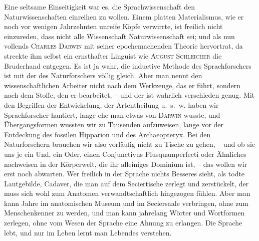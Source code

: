 \label{sp.15}

Eine seltsame Einseitigkeit war es, die Sprachwissenschaft den Naturwissenschaften einreihen zu wollen. Einem platten Materialismus, wie er noch vor wenigen Jahrzehnten unreife Köpfe verwirrte, ist freilich nicht einzureden, dass nicht alle Wissenschaft Naturwissenschaft sei; und als nun vollends \textsc{Charles Darwin} mit seiner epochemachenden Theorie hervortrat, da streckte ihm selbst ein ernsthafter Linguist wie \textsc{August Schleicher} die Bruderhand entgegen. Es ist ja wahr, die inductive Methode des Sprachforschers ist mit der des Naturforschers völlig gleich. Aber man nennt den wissenschaftlichen Arbeiter nicht nach dem Werkzeuge, das er führt, sondern nach dem Stoffe, den er bearbeitet, – und der ist wahrlich verschieden genug. Mit den Begriffen der Entwickelung, der Artentheilung u.~s.~w. haben wir Sprachforscher hantiert, lange ehe man etwas von \textsc{Darwin} wusste, und Übergangsformen wussten wir zu Tausenden aufzuweisen, lange vor der Entdeckung des fossilen Hipparion und des Archaeopteryx. Bei den Naturforschern brauchen wir also vor\-\label{fp.15}läufig nicht zu Tische zu gehen, – und ob sie uns je ein Und, ein Oder, einen Conjunctivus Plusquamperfecti oder Ähnliches nachweisen in der Körperwelt, die ihr alleiniges Dominium ist, – das wollen wir erst noch abwarten. Wer freilich in der Sprache nichts Besseres sieht, als todte Lautgebilde, Cadaver, die man auf dem Seciertische zerlegt und zerstückelt, der muss sich wohl zum Anatomen verwandtschaftlich hingezogen fühlen. Aber man kann Jahre im anatomischen Museum und im Seciersaale verbringen, ohne zum Menschenkenner zu werden, und man kann jahrelang Wörter und Wortformen zerlegen, ohne vom Wesen der Sprache eine Ahnung zu erlangen. Die Sprache lebt, und nur im Leben lernt man Lebendes verstehen.


